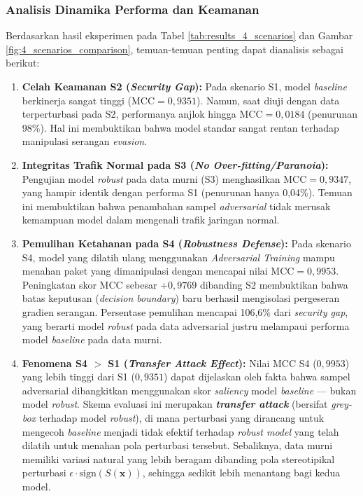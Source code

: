 \documentclass[11pt, a4paper]{article}
\begin{document}
\subsubsection{Analisis Dinamika Performa dan Keamanan}
Berdasarkan hasil eksperimen pada Tabel \ref{tab:results_4_scenarios} dan Gambar \ref{fig:4_scenarios_comparison}, temuan-temuan penting dapat dianalisis sebagai berikut:
\begin{enumerate}
    \item \textbf{Celah Keamanan S2 (\textit{Security Gap}):} Pada skenario S1, model \textit{baseline} berkinerja sangat tinggi ($\text{MCC} = 0{,}9351$). Namun, saat diuji dengan data terperturbasi pada S2, performanya anjlok hingga $\text{MCC} = 0{,}0184$ (penurunan 98\%). Hal ini membuktikan bahwa model standar sangat rentan terhadap manipulasi serangan \textit{evasion}.
    
    \item \textbf{Integritas Trafik Normal pada S3 (\textit{No Over-fitting/Paranoia}):} Pengujian model \textit{robust} pada data murni (S3) menghasilkan $\text{MCC} = 0{,}9347$, yang hampir identik dengan performa S1 (penurunan hanya 0,04\%). Temuan ini membuktikan bahwa penambahan sampel \textit{adversarial} tidak merusak kemampuan model dalam mengenali trafik jaringan normal.

    \item \textbf{Pemulihan Ketahanan pada S4 (\textit{Robustness Defense}):} Pada skenario S4, model yang dilatih ulang menggunakan \textit{Adversarial Training} mampu menahan paket yang dimanipulasi dengan mencapai nilai $\text{MCC} = 0{,}9953$. Peningkatan skor MCC sebesar $+0{,}9769$ dibanding S2 membuktikan bahwa batas keputusan (\textit{decision boundary}) baru berhasil mengisolasi pergeseran gradien serangan. Persentase pemulihan mencapai 106,6\% dari \textit{security gap}, yang berarti model \textit{robust} pada data adversarial justru melampaui performa model \textit{baseline} pada data murni.
    
    \item \textbf{Fenomena S4 $>$ S1 (\textit{Transfer Attack Effect}):} Nilai MCC S4 ($0{,}9953$) yang lebih tinggi dari S1 ($0{,}9351$) dapat dijelaskan oleh fakta bahwa sampel adversarial dibangkitkan menggunakan skor \textit{saliency} model \textit{baseline} --- bukan model \textit{robust}. Skema evaluasi ini merupakan \textbf{\textit{transfer attack}} (bersifat \textit{grey-box} terhadap model \textit{robust}), di mana perturbasi yang dirancang untuk mengecoh \textit{baseline} menjadi tidak efektif terhadap \textit{robust model} yang telah dilatih untuk menahan pola perturbasi tersebut. Sebaliknya, data murni memiliki variasi natural yang lebih beragam dibanding pola stereotipikal perturbasi $\epsilon \cdot \text{sign}(S(\mathbf{x}))$, sehingga sedikit lebih menantang bagi kedua model.
\end{enumerate}
\end{document}
